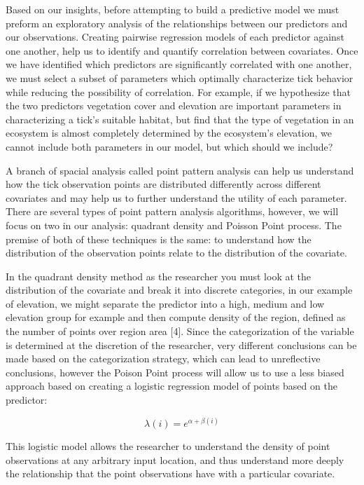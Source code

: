 \noindent Based on our insights, before attempting to build a predictive model we must preform an exploratory analysis of the relationships between our predictors and our observations. Creating pairwise regression models of each predictor against one another, help us to identify and quantify correlation between covariates. Once we have identified which predictors are significantly correlated with one another, we must select a subset of parameters which optimally characterize tick behavior while reducing the possibility of correlation. For example, if we hypothesize that the two predictors vegetation cover and elevation are important parameters in characterizing a tick's suitable habitat, but find that the type of vegetation in an ecosystem is almost completely determined by the ecosystem's elevation, we cannot include both parameters in our model, but which should we include? \newline

\noindent A branch of spacial analysis called point pattern analysis can help us understand how the tick observation points are distributed differently across different covariates and may help us to further understand the utility of each parameter. There are several types of point pattern analysis algorithms, however, we will focus on two in our analysis: quadrant density and Poisson Point process. The premise of both of these techniques is the same: to understand how the distribution of the observation points relate to the distribution of the covariate. \newline

\noindent In the quadrant density method as the researcher you must look at the distribution of the covariate and break it into discrete categories, in our example of elevation, we might separate the predictor into a high, medium and low elevation group for example and then compute density of the region, defined as the number of points over region area [4]. Since the categorization of the variable is determined at the discretion of the researcher, very different conclusions can be made based on the categorization strategy, which can lead to unreflective conclusions, however the Poison Point process will allow us to use a less biased approach based on creating a logistic regression model of points based on the predictor:

\begin{equation}
\lambda(i) = e^{\alpha +\beta(i)}
\end{equation}

\noindent This logistic model allows the researcher to understand the density of point observations at any arbitrary input location, and thus understand more deeply the relationship that the point observations have with a particular covariate.\newline


